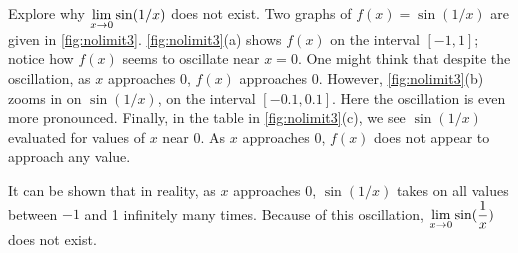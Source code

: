 \begin{example}\label{ex_no_limit3}%
Explore why $\displaystyle\lim_{x\to 0}\sin(1/x)$ does not exist.
\solution
Two graphs of $f(x) = \sin(1/x)$ are given in \autoref{fig:nolimit3}. \autoref{fig:nolimit3}(a) shows $f(x)$ on the interval $[-1,1]$; notice how $f(x)$ seems to oscillate near $x=0$. One might think that despite the oscillation, as $x$ approaches 0, $f(x)$ approaches 0. However, \autoref{fig:nolimit3}(b) zooms in on $\sin(1/x)$, on the interval $[-0.1,0.1]$. Here the oscillation is even more pronounced. Finally, in the table in \autoref{fig:nolimit3}(c), we see $\sin(1/x)$ evaluated for values of $x$ near 0. As $x$ approaches 0, $f(x)$ does not appear to approach any value. 

It can be shown that in reality, as $x$ approaches 0, $\sin(1/x)$ takes on all values between $-1$ and 1 infinitely many times. Because of this oscillation,
$\displaystyle\lim_{x\to 0}\sin(\frac1x)$ does not exist.
\end{example}

